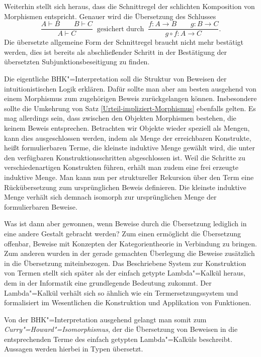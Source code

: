 \noindent
Weiterhin stellt sich heraus, dass die Schnittregel der schlichten
Komposition von Morphismen entspricht. Genauer wird die Übersetzung des
Schlusses
\[\dfrac{A\vdash B\qquad B\vdash C}{A\vdash C}\;\;\text{gesichert durch}\;\;
\dfrac{f\colon A\to B\qquad g\colon B\to C}{g\circ f\colon A\to C}.\]
Die übersetzte allgemeine Form der Schnittregel braucht nicht mehr
bestätigt werden, dies ist bereits als abschließender Schritt in der
Bestätigung der übersetzten Subjunktionsbeseitigung zu finden.

Die eigentliche BHK"=Interpretation soll die Struktur von Beweisen der
intuitionistischen Logik erklären. Dafür sollte man aber am besten
ausgehend von einem Morphismus zum zugehörigen Beweis zurückgelangen
können. Insbesondere sollte die Umkehrung von Satz
\ref{Urteil-impliziert-Morphismus} ebenfalls gelten.
Es mag allerdings sein, dass zwischen den Objekten Morphismen bestehen,
die keinem Beweis entsprechen. Betrachten wir Objekte wieder
speziell als Mengen, kann dies ausgeschlossen werden, indem als Menge
der erreichbaren Konstrukte, heißt formulierbaren Terme, die kleinste
induktive Menge gewählt wird, die unter den verfügbaren
Konstruktionsschritten abgeschlossen ist. Weil die Schritte zu
verschiedenartigen Konstrukten führen, erhält man zudem eine frei
erzeugte induktive Menge. Man kann nun per struktureller Rekursion über
den Term eine Rückübersetzung zum ursprünglichen Beweis definieren.
Die kleinste induktive Menge verhält sich demnach isomorph zur
ursprünglichen Menge der formulierbaren Beweise.

Was ist dann aber gewonnen, wenn Beweise durch die Übersetzung
lediglich in eine andere Gestalt gebracht werden? Zum einen ermöglicht
die Übersetzung offenbar, Beweise mit Konzepten der Kategorientheorie
in Verbindung zu bringen. Zum anderen wurden in der gerade gemachten
Überlegung die Beweise zusätzlich in die Übersetzung miteinbezogen.
Das Beschriebene System zur Konstruktion von Termen stellt sich später
als der einfach getypte Lambda"=Kalkül heraus, dem in der Informatik
eine grundlegende Bedeutung zukommt. Der Lambda"=Kalkül verhält sich so
ähnlich wie ein Termersetzungssystem und formalisiert im Wesentlichen
die Konstruktion und Applikation von Funktionen.

Von der BHK"=Interpretation ausgehend gelangt man somit zum
\emph{Curry"=Howard"=Isomorphismus}, der die Übersetzung von Beweisen
in die entsprechenden Terme des einfach getypten Lambda"=Kalküls
beschreibt. Aussagen werden hierbei in Typen übersetzt.
